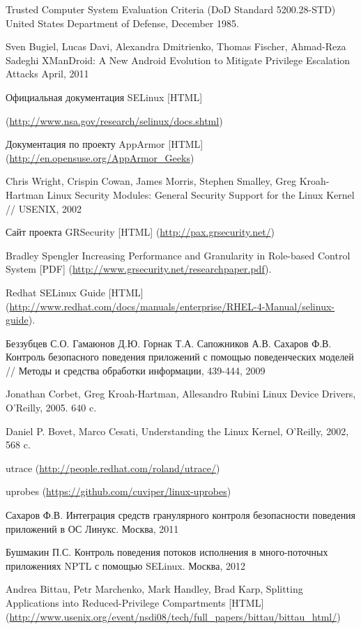 \begin{thebibliography}{99}

Trusted Computer System Evaluation Criteria (DoD Standard 5200.28-STD)
United States Department of Defense, December 1985.

Sven Bugiel, Lucas Davi, Alexandra Dmitrienko, Thomas Fischer, Ahmad-Reza Sadeghi
XManDroid: A New Android Evolution to Mitigate Privilege Escalation Attacks
April, 2011

Официальная документация SELinux [HTML] 

(\url{http://www.nsa.gov/research/selinux/docs.shtml})

Документация по проекту AppArmor [HTML]
(\url{http://en.opensuse.org/AppArmor\_Geeks})

Chris Wright, Crispin Cowan, James Morris, Stephen Smalley, Greg
Kroah-Hartman
Linux Security Modules: General Security Support for the Linux Kernel 
// USENIX, 2002

Сайт проекта GRSecurity [HTML] 
(\url{http://pax.grsecurity.net/})

Bradley Spengler Increasing Performance and Granularity
in Role-based Control System [PDF]
(\url{http://www.grsecurity.net/researchpaper.pdf}).

 Redhat SELinux Guide [HTML]
 (\url{http://www.redhat.com/docs/manuals/enterprise/RHEL-4-Manual/selinux-guide}).

Беззубцев С.О. Гамаюнов Д.Ю. Горнак Т.А. Сапожников А.В.
Сахаров Ф.В. Контроль безопасного поведения приложений
с помощью поведенческих моделей // Методы и средства обработки информации, 439-444, 2009

Jonathan Corbet, Greg Kroah-Hartman, Allesandro Rubini Linux Device Drivers, O'Reilly, 2005. 640 c.

Daniel P. Bovet, Marco Cesati, Understanding the Linux Kernel, O'Reilly, 2002, 568 c.
 
utrace
(\url{http://people.redhat.com/roland/utrace/})

uprobes
(\url{https://github.com/cuviper/linux-uprobes})

Сахаров Ф.В. Интеграция средств гранулярного контроля безопасности
поведения приложений в ОС Линукс. Москва, 2011

Бушмакин П.С. Контроль поведения потоков исполнения в много-поточных
приложениях NPTL с помощью SELinux. Москва, 2012


Andrea Bittau, Petr Marchenko, Mark Handley, Brad Karp,
Splitting Applications into Reduced-Privilege Compartments [HTML]
(\url{http://www.usenix.org/event/nsdi08/tech/full\_papers/bittau/bittau\_html/}) 

\end{thebibliography}
